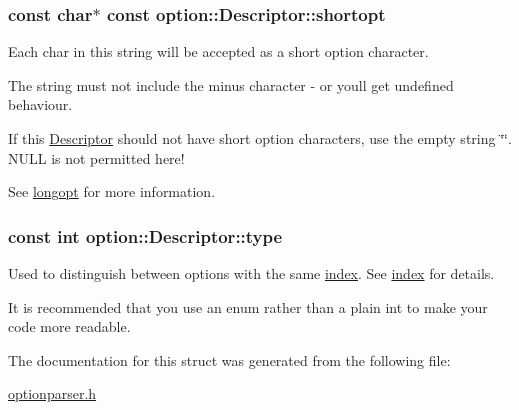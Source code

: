 \subsubsection[{\texorpdfstring{shortopt}{shortopt}}]{\setlength{\rightskip}{0pt plus 5cm}const char$\ast$ const option\+::\+Descriptor\+::shortopt}\hypertarget{structoption_1_1Descriptor_a0dba4ccca59c19d6ed4081391fca5adb}{}\label{structoption_1_1Descriptor_a0dba4ccca59c19d6ed4081391fca5adb}


Each char in this string will be accepted as a short option character. 

The string must not include the minus character {\ttfamily \textquotesingle{}-\/\textquotesingle{}} or you\textquotesingle{}ll get undefined behaviour.

If this \hyperlink{structoption_1_1Descriptor}{Descriptor} should not have short option characters, use the empty string \char`\"{}\char`\"{}. N\+U\+LL is not permitted here!

See \hyperlink{structoption_1_1Descriptor_a470c449dfa894c9bfda2dae026142b4b}{longopt} for more information. 
\subsubsection[{\texorpdfstring{type}{type}}]{\setlength{\rightskip}{0pt plus 5cm}const int option\+::\+Descriptor\+::type}\hypertarget{structoption_1_1Descriptor_a1b220dabd8aad075fa441a80f9b9343c}{}\label{structoption_1_1Descriptor_a1b220dabd8aad075fa441a80f9b9343c}


Used to distinguish between options with the same \hyperlink{structoption_1_1Descriptor_a1fee8ac44f529c99ac2b1149b4c391b1}{index}. See \hyperlink{structoption_1_1Descriptor_a1fee8ac44f529c99ac2b1149b4c391b1}{index} for details. 

It is recommended that you use an enum rather than a plain int to make your code more readable. 

The documentation for this struct was generated from the following file\+:\begin{DoxyCompactItemize}
\item 
\hyperlink{optionparser_8h}{optionparser.\+h}\end{DoxyCompactItemize}
